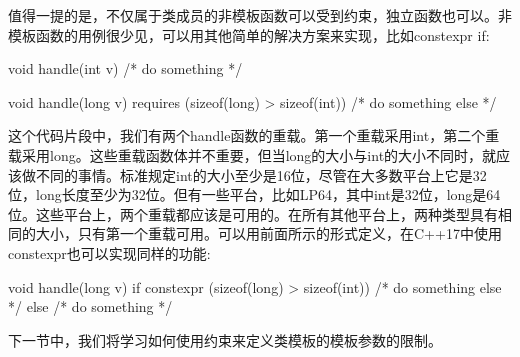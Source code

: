 值得一提的是，不仅属于类成员的非模板函数可以受到约束，独立函数也可以。非模板函数的用例很少见，可以用其他简单的解决方案来实现，比如constexpr if:

\begin{cpp}
void handle(int v)
{ /* do something */ }

void handle(long v)
	requires (sizeof(long) > sizeof(int))
{ /* do something else */ }
\end{cpp}

这个代码片段中，我们有两个handle函数的重载。第一个重载采用int，第二个重载采用long。这些重载函数体并不重要，但当long的大小与int的大小不同时，就应该做不同的事情。标准规定int的大小至少是16位，尽管在大多数平台上它是32位，long长度至少为32位。但有一些平台，比如LP64，其中int是32位，long是64位。这些平台上，两个重载都应该是可用的。在所有其他平台上，两种类型具有相同的大小，只有第一个重载可用。可以用前面所示的形式定义，在C++17中使用constexpr也可以实现同样的功能:

\begin{cpp}
void handle(long v)
{
	if constexpr (sizeof(long) > sizeof(int))
	{
		/* do something else */
	}
	else
	{
		/* do something */
	}
}
\end{cpp}

下一节中，我们将学习如何使用约束来定义类模板的模板参数的限制。


